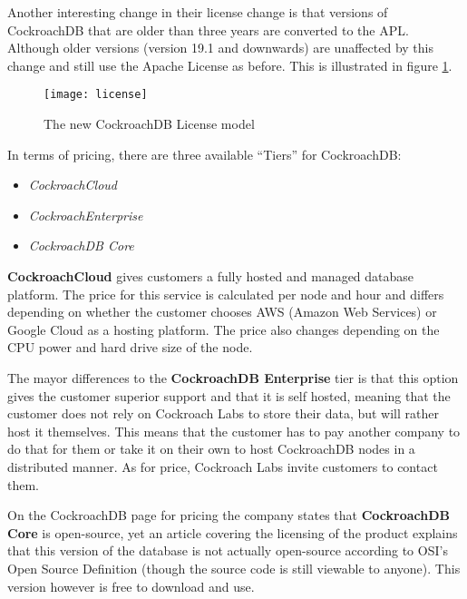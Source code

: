 \medskip
Another interesting change in their license change is that versions of CockroachDB that are older than three years are converted to the APL. Although older versions (version 19.1 and downwards) are unaffected by this change and still use the Apache License as before. This is illustrated in figure \ref{fig:license}.

\begin{figure}[H]
    \caption{The new CockroachDB License model\cite{cockroach-license}}
    \texttt{[image: license]}
    \label{fig:license}
\end{figure}


\bigskip
In terms of pricing, there are three available \enquote{Tiers} for CockroachDB:
\begin{itemize}
    \item \emph{CockroachCloud}
	\item \emph{CockroachEnterprise}
	\item \emph{CockroachDB Core}
\end{itemize}

\textbf{CockroachCloud} gives customers a fully hosted and managed database platform. 
The price for this service is calculated per node and hour and differs depending on whether the customer chooses AWS (Amazon Web Services) or Google Cloud as a hosting platform.
The price also changes depending on the CPU power and hard drive size of the node.
\cite{cockroach-pricing}

\medskip
The mayor differences to the \textbf{CockroachDB Enterprise} tier is that this option gives the customer superior support and that it is self hosted, meaning that the customer does not rely on Cockroach Labs to store their data, but will rather host it themselves. This means that the customer has to pay another company to do that for them or take it on their own to host CockroachDB nodes in a distributed manner.
As for price, Cockroach Labs invite customers to contact them.
\cite{cockroach-pricing}

\medskip
On the CockroachDB page for pricing the company states that \textbf{CockroachDB Core} is open-source,\cite{cockroach-pricing} yet an article covering the licensing of the product explains that this version of the database is not actually open-source according to OSI’s Open Source Definition (though the source code is still viewable to anyone).\cite{cockroach-license}
This version however is free to download and use. 



